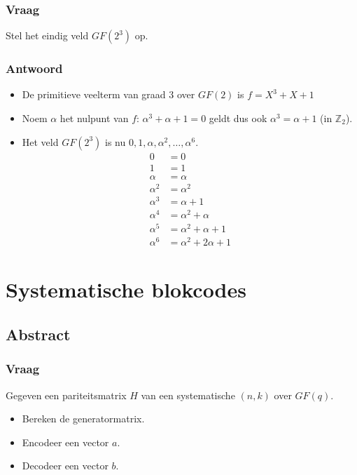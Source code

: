\documentclass[main.tex]{subfiles}
\begin{document}
\subsubsection*{Vraag}
Stel het eindig veld $GF(2^{3})$ op.

\subsubsection*{Antwoord}
\begin{itemize}
\item De primitieve veelterm van graad $3$ over $GF(2)$ is $f=X^{3}+X+1$
\item Noem $\alpha$ het nulpunt van $f$: $\alpha^{3} + \alpha + 1=0$ geldt dus ook $\alpha^{3} = \alpha + 1$ (in $\mathbb{Z}_{2}$).
\item Het veld $GF(2^{3})$ is nu $0,1,\alpha,\alpha^{2},\dotsc,\alpha^{6}$.
  \[
  \begin{array}{rl}
    0 &= 0\\
    1 &= 1\\
    \alpha &= \alpha\\
    \alpha^{2} &= \alpha^{2}\\
    \alpha^{3} &= \alpha + 1\\
    \alpha^{4} &= \alpha^{2} + \alpha\\
    \alpha^{5} &= \alpha^{2} + \alpha + 1\\
    \alpha^{6} &= \alpha^{2} + 2\alpha + 1
  \end{array}
  \]
\end{itemize}

\newpage
\section{Systematische blokcodes}
\subsection*{Abstract}
\subsubsection*{Vraag}
Gegeven een pariteitsmatrix $H$ van een systematische $(n,k)$ over $GF(q)$.
\begin{itemize}
\item Bereken de generatormatrix.
\item Encodeer een vector $a$.
\item Decodeer een vector $b$.
\end{itemize}
\end{document}
